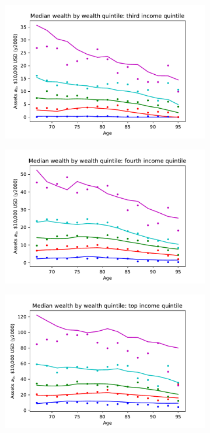 \documentclass[12pt,pdftex,letterpaper]{article}
\begin{document}
\begin{figure}[h!]
\begin{subfigure}[b]{0.49\textwidth}
   \end{subfigure}
   \begin{subfigure}[b]{0.49\textwidth}
      \centering
      \includegraphics[width=\textwidth]{../Figures/WealthByIncWealthAge3.pdf}
   \end{subfigure}
   \begin{subfigure}[b]{0.49\textwidth}
      \centering
      \includegraphics[width=\textwidth]{../Figures/WealthByIncWealthAge4.pdf}
   \end{subfigure}
   \begin{subfigure}[b]{0.49\textwidth}
      \centering
      \includegraphics[width=\textwidth]{../Figures/WealthByIncWealthAge5.pdf}

\end{subfigure}
\end{figure}
\end{document}
